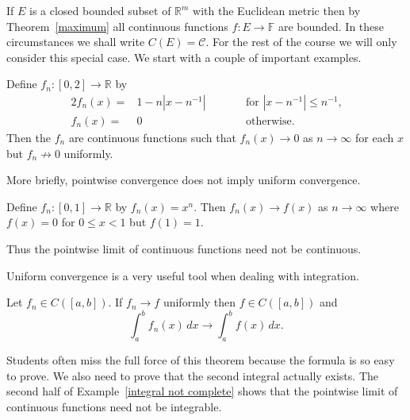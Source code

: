 If $E$ is a closed bounded subset of ${\mathbb R}^{m}$
with the Euclidean metric then by Theorem~\ref{maximum}
all continuous functions $f:E\rightarrow{\mathbb F}$
are bounded. In these circumstances we shall
write $C(E)=\mathcal{C}$. 
For the rest of the course we will only
consider this special case. We start with a couple of
important examples.
\begin{example} Define 
$f_{n}:[0,2]\rightarrow{\mathbb R}$ by
\begin{alignat*}{2}
f_{n}(x)=&1-n|x-n^{-1}|&&\qquad\text{for $|x-n^{-1}|\leq n^{-1}$,}\\
f_{n}(x)=&0&&\qquad\text{otherwise.}
\end{alignat*}
Then the $f_{n}$ are continuous functions such that
$f_{n}(x)\rightarrow 0$ as $n\rightarrow \infty$
for each $x$ but $f_{n}\nrightarrow 0$ uniformly.
\end{example}
More briefly, pointwise convergence does not imply
uniform convergence.
\begin{example} Define $f_{n}:[0,1]\rightarrow{\mathbb R}$
by $f_{n}(x)=x^{n}$. Then $f_{n}(x)\rightarrow f(x)$
as $n\rightarrow\infty$ where $f(x)=0$ for $0\leq x<1$
but $f(1)=1$.
\end{example}
Thus the pointwise limit of continuous functions need
not be continuous.

Uniform convergence is a very useful tool when dealing
with integration.
\begin{theorem}\label{limit of integral}
Let $f_{n}\in C([a,b])$. 
If $f_{n}\rightarrow f$ uniformly then $f\in C([a,b])$
and
\[\int_{a}^{b}f_{n}(x)\,dx\rightarrow \int_{a}^{b}f(x)\,dx.\]
\end{theorem}
Students often miss the full force of this theorem
because the formula is so easy to prove. We also
need to prove that the second integral actually
exists.
The second half of Example~\ref{integral not complete} 
shows that the pointwise limit
of continuous functions need not be integrable.

